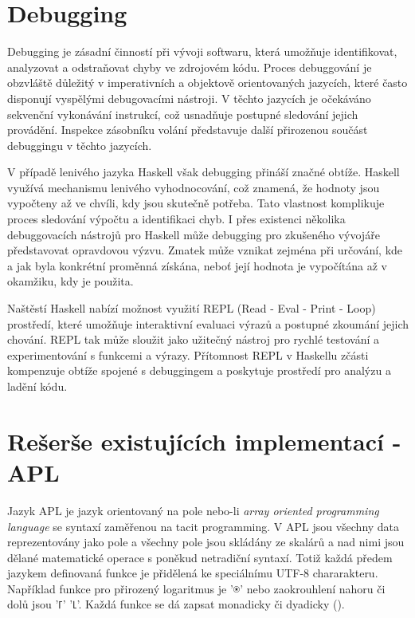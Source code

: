 \documentclass[male,czech]{kithesis}
\begin{document}
\section{Debugging}

Debugging je zásadní činností při vývoji softwaru, která umožňuje identifikovat, 
analyzovat a odstraňovat chyby ve zdrojovém kódu. 
Proces debuggování je obzvláště důležitý v imperativních a objektově orientovaných jazycích, 
které často disponují vyspělými debugovacími nástroji. 
V těchto jazycích je očekáváno sekvenční vykonávání instrukcí, 
což usnadňuje postupné sledování jejich provádění. 
Inspekce zásobníku volání představuje 
další přirozenou součást debuggingu v těchto jazycích.

V případě lenivého jazyka Haskell však debugging přináší značné obtíže. 
Haskell využívá mechanismu lenivého vyhodnocování, což znamená, 
že hodnoty jsou vypočteny až ve chvíli, kdy jsou skutečně potřeba. 
Tato vlastnost komplikuje proces sledování výpočtu a identifikaci chyb. 
I přes existenci několika debuggovacích nástrojů pro Haskell může 
debugging pro zkušeného vývojáře představovat opravdovou výzvu. 
Zmatek může vznikat zejména při určování, 
kde a jak byla konkrétní proměnná získána, 
neboť její hodnota je vypočítána až v okamžiku, 
kdy je použita.

Naštěstí Haskell nabízí možnost využití REPL 
(Read - Eval - Print - Loop) prostředí, 
které umožňuje interaktivní evaluaci výrazů a postupné zkoumání jejich chování. 
REPL tak může sloužit jako užitečný nástroj pro rychlé testování 
a experimentování s funkcemi a výrazy. 
Přítomnost REPL v Haskellu zčásti kompenzuje obtíže spojené 
s debuggingem a poskytuje prostředí pro analýzu a ladění kódu.

\section{Rešerše existujících implementací - APL}

Jazyk APL je jazyk orientovaný na pole nebo-li \textit{array oriented programming language} se 
syntaxí zaměřenou na tacit programming. V APL jsou všechny data reprezentovány jako pole 
a všechny pole jsou skládány ze skalárů a nad 
nimi jsou dělané matematické operace s poněkud netradiční syntaxí. Totiž každá 
předem jazykem definovaná funkce je přidělená ke speciálnímu UTF-8 chararakteru. 
Například funkce pro přirozený logaritmus je {\apl '⍟'} nebo zaokrouhlení nahoru či dolů 
jsou {\apl '⌈' '⌊'}.
Každá funkce se dá zapsat monadicky či dyadicky (\cite{WhyAPLIsWorthKnowing}).
\end{document}
